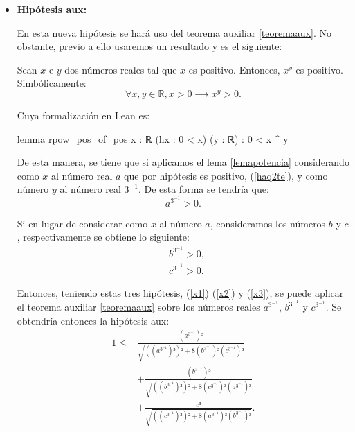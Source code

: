\begin{demostracion}
\begin{itemize}
  \item \textbf{Hipótesis aux:}

    En esta nueva hipótesis se hará uso del teorema auxiliar
    \ref{teoremaaux}. No obstante, previo a ello usaremos un resultado
    y es el siguiente:

    \begin{lema}\label{lemapotencia}
      Sean \(x\) e \(y\) dos números reales tal que \(x\) es positivo.
      Entonces, \(x^{y}\) es positivo. Simbólicamente:
      \begin{equation}
        ∀x, y ∈ ℝ, x > 0 ⟶ x^{y}> 0.
      \end{equation}
    \end{lema}
    Cuya formalización en Lean es:

    \begin{leancode}
    lemma rpow_pos_of_pos {x : ℝ} (hx : 0 < x) (y : ℝ) : 0 < x ^ y
    \end{leancode}

    De esta manera, se tiene que si aplicamos el lema \ref{lemapotencia}
    considerando como \(x\) al número real \(a\) que por hipótesis es
    positivo, (\ref{haq2te}), y como número \(y\) al número real
    \(3^{-1} \). De esta forma se tendría que:
    \begin{equation}\label{x1}
      a^{3^{-1}} > 0.
    \end{equation}

    Si en lugar de considerar como \(x\) al número \(a\), consideramos
    los números \(b\) y \(c\), respectivamente se obtiene lo siguiente:
    \begin{align}
      &b^{3^{-1}} > 0,\label{x2}\\
      &c^{3^{-1}} > 0.\label{x3}
    \end{align}

    Entonces, teniendo estas tres hipótesis, (\ref{x1}) (\ref{x2}) y
    (\ref{x3}), se puede aplicar el teorema auxiliar \ref{teoremaaux}
    sobre los números reales \(a^{3^{-1}}\), \(b^{3^{-1}}\) y \(c^{3^{-1}}\).
    Se obtendría entonces la hipótesis aux:
    \begin{align*}\label{auxfinal}\tag{aux}
      1 ≤ & \frac{(a^{3^{-1}})³}{\sqrt{((a^{3^{-1}})³)²+8(b^{3^{-1}})³(c^{3^{-1}})³}} \\
          & + \frac{(b^{3^{-1}})³}{\sqrt{((b^{3^{-1}})³)²+8(c^{3^{-1}})³(a^{3^{-1}})³}}\\
          & + \frac{c³}{\sqrt{((c^{3^{-1}})³)²+8(a^{3^{-1}})³(b^{3^{-1}})³}}.
    \end{align*}
  \end{itemize}


\end{demostracion}
